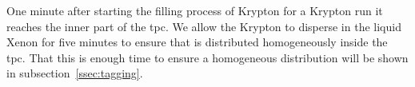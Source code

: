 One minute after starting the filling process of Krypton for a Krypton run it reaches the inner part of the \gls{tpc}.
We allow the Krypton to disperse in the liquid Xenon for five minutes to ensure that is distributed homogeneously inside the \gls{tpc}.
That this is enough time to ensure a homogeneous distribution will be shown in subsection~\ref{ssec:tagging}.



\FloatBarrier
